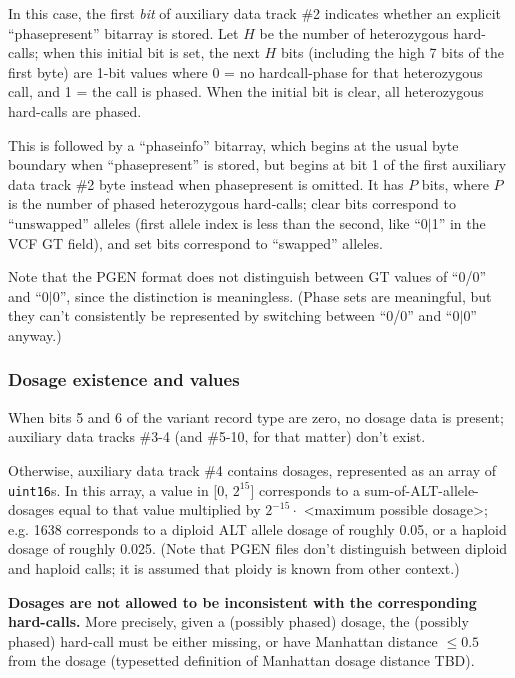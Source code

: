 \documentclass[8pt]{article}
\begin{document}
In this case, the first \textit{bit} of auxiliary data track \#2 indicates
whether an explicit ``phasepresent'' bitarray is stored.  Let $H$ be the number
of heterozygous hard-calls; when this initial bit is set, the next $H$ bits
(including the high 7 bits of the first byte) are 1-bit values where 0 = no
hardcall-phase for that heterozygous call, and 1 = the call is phased.  When
the initial bit is clear, all heterozygous hard-calls are phased.

This is followed by a ``phaseinfo'' bitarray, which begins at the usual byte
boundary when ``phasepresent'' is stored, but begins at bit 1 of the first
auxiliary data track \#2 byte instead when phasepresent is omitted.  It has $P$
bits, where $P$ is the number of phased heterozygous hard-calls; clear bits
correspond to ``unswapped'' alleles (first allele index is less than the
second, like ``0$|$1'' in the VCF GT field), and set bits correspond to
``swapped'' alleles.

Note that the PGEN format does not distinguish between GT values of ``0/0'' and
``0$|$0'', since the distinction is meaningless.  (Phase sets are meaningful,
but they can't consistently be represented by switching between ``0/0'' and
``0$|$0'' anyway.)

\subsubsection{Dosage existence and values}

When bits 5 and 6 of the variant record type are zero, no dosage data is
present; auxiliary data tracks \#3-4 (and \#5-10, for that matter) don't exist.

Otherwise, auxiliary data track \#4 contains dosages, represented as an array
of \texttt{uint16}s.  In this array, a value in [0, $2^{15}$] corresponds to a
sum-of-ALT-allele-dosages equal to that value multiplied by $2^{-15}\cdot $
\textless maximum possible dosage\textgreater ; e.g. 1638 corresponds to a
diploid ALT allele dosage of roughly 0.05, or a haploid dosage of roughly
0.025.  (Note that PGEN files don't distinguish between diploid and haploid
calls; it is assumed that ploidy is known from other context.)

\textbf{Dosages are not allowed to be inconsistent with the corresponding
hard-calls.}  More precisely, given a (possibly phased) dosage, the (possibly
phased) hard-call must be either missing, or have Manhattan distance $\leq 0.5$
from the dosage (typesetted definition of Manhattan dosage distance TBD).
\end{document}
